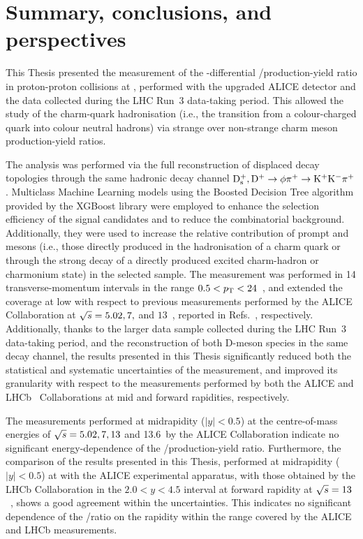 \chapter[Summary, conclusions, and perspectives]{\texorpdfstring{Summary, conclusions, and\\ perspectives}{Summary, conclusions, and perspectives} }\label{ch:conclusions}

This Thesis presented the measurement of the \pt-differential \ds/\dpl production-yield ratio in proton-proton collisions at \thirteen, performed with the upgraded ALICE detector and the data collected during the LHC Run~3 data-taking period. This allowed the study of the charm-quark hadronisation (i.e., the transition from a colour-charged quark into colour neutral hadrons) via strange over non-strange charm meson production-yield ratios.

The analysis was performed via the full reconstruction of displaced decay topologies through the same hadronic decay channel $\mathrm{D_s^+}, \mathrm{D^+} \rightarrow \phi\pi^+\rightarrow\mathrm{K^+K^-\pi^+}$. Multiclass Machine Learning models using the Boosted Decision Tree algorithm provided by the XGBoost library were employed to enhance the selection efficiency of the signal candidates and to reduce the combinatorial background. Additionally, they were used to increase the relative contribution of prompt \ds and \dpl mesons (i.e., those directly produced in the hadronisation of a charm quark or through the strong decay of a directly produced excited charm-hadron or charmonium state) in the selected sample. The measurement was performed in 14 transverse-momentum intervals in the range $0.5<p_\mathrm{T}<24$~\gevc, and extended the \pt coverage at low \pt with respect to previous measurements performed by the ALICE Collaboration at $\sqrt{s} = 5.02, 7,$ and $13$~\tev, reported in Refs.~\cite{ALICE:2021mgk,ALICE:2017olh,ALICE:2023sgl}, respectively. Additionally, thanks to the larger data sample collected during the LHC Run~3 data-taking period, and the reconstruction of both D-meson species in the same decay channel, the results presented in this Thesis significantly reduced both the statistical and systematic uncertainties of the measurement, and improved its granularity with respect to the measurements performed by both the ALICE and LHCb~\cite{LHCb:2015swx} Collaborations at mid and forward rapidities, respectively.

The measurements performed at midrapidity ($\lvert y\rvert<0.5$) at the centre-of-mass energies of  $\sqrt{s} = 5.02, 7, 13$ and 13.6~\tev by the ALICE Collaboration indicate no significant energy-dependence of the \ds/\dpl production-yield ratio. Furthermore, the comparison of the results presented in this Thesis, performed at midrapidity ($\lvert y\rvert<0.5$) at \thirteen with the ALICE experimental apparatus, with those obtained by the LHCb Collaboration in the $2.0<y<4.5$ interval at forward rapidity at $\sqrt{s}=13$~\tev, shows a good agreement within the uncertainties. This indicates no significant dependence of the \ds/\dpl ratio on the rapidity within the range covered by the ALICE and LHCb measurements. 


